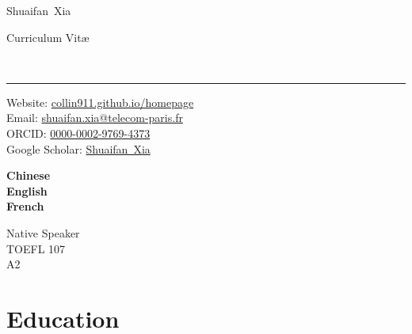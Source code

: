 \documentclass[9pt,a4paper]{article}
\makeatletter
\newcommand{\Title}{Curriculum Vit\ae}
\newcommand{\FirstName}{Shuaifan}
\newcommand{\LastName}{Xia}
\newcommand{\MyName}{\FirstName\ \LastName}
\newcommand{\Email}{shuaifan.xia@telecom-paris.fr}
\newcommand{\PersonalWebsite}{collin911.github.io/homepage}
\newcommand{\ORCID}{0000-0002-9769-4373}
\newcommand{\Website}[1]{\href{https://#1}{#1}}
\makeatother
\begin{document}
\begin{minipage}[t]{0.5\textwidth}
  {\fontsize{20pt}{0}\selectfont\MyName}
\end{minipage}
\begin{minipage}[t]{0.5\textwidth}
  \begin{flushright}
    \Title{}
  \end{flushright}
\end{minipage}
\\[-0.1cm]
\textcolor{lightgray}{\rule{\textwidth}{3pt}}
\begin{minipage}[t]{0.75\textwidth}
  Website: \Website{\PersonalWebsite}
  \\
  Email: \href{mailto:\Email}{\Email}
  \\
  ORCID: \href{https://orcid.org/\ORCID}{\ORCID}
  \\
  Google Scholar: \href{https://scholar.google.com/citations?user=x4Y8uCAAAAAJ}{\MyName}
\end{minipage}
\begin{minipage}[t]{0.07\textwidth}
    \textbf{Chinese} 
    \\
    \textbf{English} 
    \\
    \textbf{French} 
    \\
\end{minipage}
\begin{minipage}[t]{0.18\textwidth}
  \begin{flushright}
    Native Speaker
    \\
    TOEFL 107
    \\
    A2
    \\
  \end{flushright}
\end{minipage}


\section{Education}
\end{document}
